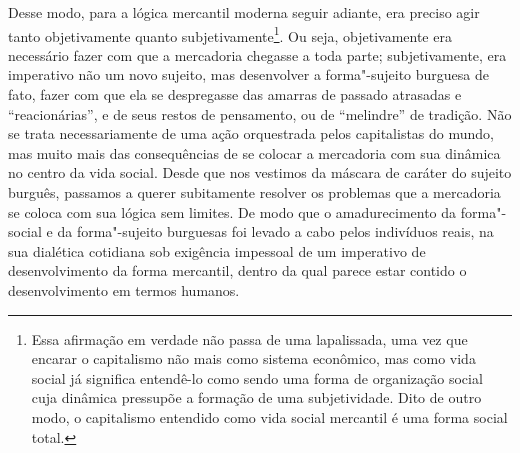 Desse modo, para a lógica mercantil moderna seguir adiante, era preciso
agir tanto objetivamente quanto subjetivamente\footnote{Essa afirmação
  em verdade não passa de uma lapalissada, uma vez que encarar o
  capitalismo não mais como sistema econômico, mas como vida social já significa
  entendê-lo como sendo uma forma de organização social cuja dinâmica
  pressupõe a formação de uma subjetividade. Dito de outro modo, o
  capitalismo entendido como vida social mercantil é uma forma social
  total.}. Ou seja, objetivamente era necessário fazer com que a
mercadoria chegasse a toda parte; subjetivamente, era imperativo não um
novo sujeito, mas desenvolver a forma"-sujeito burguesa de fato, fazer
com que ela se despregasse das amarras de passado atrasadas e
``reacionárias'', e de seus restos de pensamento, ou de ``melindre'' de
tradição. Não se trata necessariamente de uma ação orquestrada pelos
capitalistas do mundo, mas muito mais das consequências de se colocar a
mercadoria com sua dinâmica no centro da vida social. Desde que nos
vestimos da máscara de caráter do sujeito burguês, passamos a querer
subitamente resolver os problemas que a mercadoria se coloca com sua
lógica sem limites. De modo que o amadurecimento da forma"-social e da
forma"-sujeito burguesas foi levado a cabo pelos indivíduos reais, na sua
dialética cotidiana sob exigência impessoal de um imperativo de
desenvolvimento da forma mercantil, dentro da qual parece estar contido
o desenvolvimento em termos humanos.


